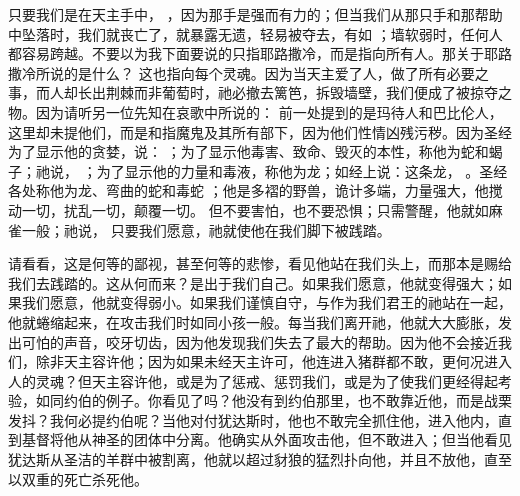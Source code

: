 只要我们是在天主手中， ，因为那手是强而有力的；但当我们从那只手和那帮助中坠落时，我们就丧亡了，就暴露无遗，轻易被夺去，有如 ；墙软弱时，任何人都容易跨越。不要以为我下面要说的只指耶路撒冷，而是指向所有人。那关于耶路撒冷所说的是什么？  这也指向每个灵魂。因为当天主爱了人，做了所有必要之事，而人却长出荆棘而非葡萄时，祂必撤去篱笆，拆毁墙壁，我们便成了被掠夺之物。因为请听另一位先知在哀歌中所说的：  前一处提到的是玛待人和巴比伦人，这里却未提他们，而是和指魔鬼及其所有部下，因为他们性情凶残污秽。因为圣经为了显示他的贪婪，说： ；为了显示他毒害、致命、毁灭的本性，称他为蛇和蝎子；祂说， ；为了显示他的力量和毒液，称他为龙；如经上说：这条龙， 。圣经各处称他为龙、弯曲的蛇和毒蛇 ；他是多褶的野兽，诡计多端，力量强大，他搅动一切，扰乱一切，颠覆一切。 但不要害怕，也不要恐惧；只需警醒，他就如麻雀一般；祂说， 只要我们愿意，祂就使他在我们脚下被践踏。\par

请看看，这是何等的鄙视，甚至何等的悲惨，看见他站在我们头上，而那本是赐给我们去践踏的。这从何而来？是出于我们自己。如果我们愿意，他就变得强大；如果我们愿意，他就变得弱小。如果我们谨慎自守，与作为我们君王的祂站在一起，他就蜷缩起来，在攻击我们时如同小孩一般。每当我们离开祂，他就大大膨胀，发出可怕的声音，咬牙切齿，因为他发现我们失去了最大的帮助。因为他不会接近我们，除非天主容许他；因为如果未经天主许可，他连进入猪群都不敢，更何况进入人的灵魂？但天主容许他，或是为了惩戒、惩罚我们，或是为了使我们更经得起考验，如同约伯的例子。你看见了吗？他没有到约伯那里，也不敢靠近他，而是战栗发抖？我何必提约伯呢？当他对付犹达斯时，他也不敢完全抓住他，进入他内，直到基督将他从神圣的团体中分离。他确实从外面攻击他，但不敢进入；但当他看见犹达斯从圣洁的羊群中被割离，他就以超过豺狼的猛烈扑向他，并且不放他，直至以双重的死亡杀死他。\par


